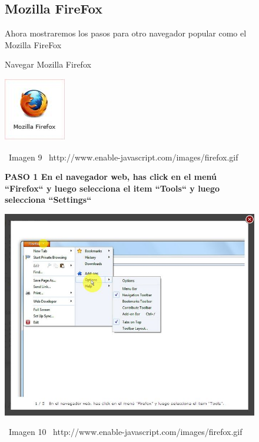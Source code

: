 \documentclass[11pt]{article} %
\begin{document}
\begin{figure}
\subsection{Mozilla FireFox}

Ahora mostraremos los pasos para otro navegador popular como el Mozilla FireFox
\begin{center}
\begin{center}
Navegar Mozilla Firefox

\end{center}
\begin{center}
\includegraphics[height=3 cm, width=3 cm] {imagenes/firefox.jpg}
\end{center}


\ Imagen 9
\ {http://www.enable-javascript.com/images/firefox.gif }\\

\begin{center}

\bf PASO 1 
En el navegador web, has click en el menú ``Firefox`` y luego selecciona el item ``Tools``
y luego selecciona ``Settings``


\includegraphics[height=8 cm, width=8 cm] {imagenes/firefox 01.jpg}
\end{center}
\ Imagen 10
\ {http://www.enable-javascript.com/images/firefox.gif }

\end{center}
\end{figure}
\end{document}
